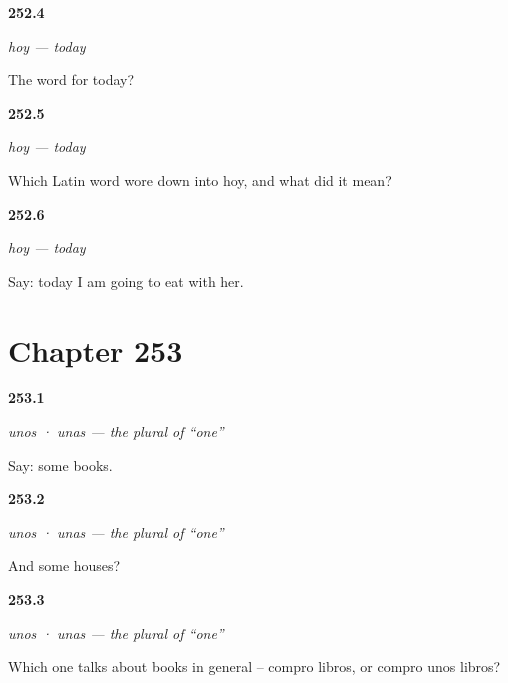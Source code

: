 \noindent\begin{minipage}[t]{\linewidth}
\raggedright
\hypertarget{review-ES-C65-hoy-word}{\textbf{252.4}} \emph{hoy — today}\par
\small The word for today?
\end{minipage}\par\medskip

\noindent\begin{minipage}[t]{\linewidth}
\raggedright
\hypertarget{review-ES-C65-hoy-latin}{\textbf{252.5}} \emph{hoy — today}\par
\small Which Latin word wore down into hoy, and what did it mean?
\end{minipage}\par\medskip

\noindent\begin{minipage}[t]{\linewidth}
\raggedright
\hypertarget{review-ES-C65-hoy-tense}{\textbf{252.6}} \emph{hoy — today}\par
\small Say: today I am going to eat with her.
\end{minipage}\par\medskip

\section*{Chapter 253}

\noindent\begin{minipage}[t]{\linewidth}
\raggedright
\hypertarget{review-ES-C65-unos-unas-say}{\textbf{253.1}} \emph{unos · unas — the plural of \textquotedblleft{}one\textquotedblright{}}\par
\small Say: some books.
\end{minipage}\par\medskip

\noindent\begin{minipage}[t]{\linewidth}
\raggedright
\hypertarget{review-ES-C65-unos-unas-fem}{\textbf{253.2}} \emph{unos · unas — the plural of \textquotedblleft{}one\textquotedblright{}}\par
\small And some houses?
\end{minipage}\par\medskip

\noindent\begin{minipage}[t]{\linewidth}
\raggedright
\hypertarget{review-ES-C65-unos-unas-bare}{\textbf{253.3}} \emph{unos · unas — the plural of \textquotedblleft{}one\textquotedblright{}}\par
\small Which one talks about books in general -- compro libros, or compro unos libros?
\end{minipage}\par\medskip

